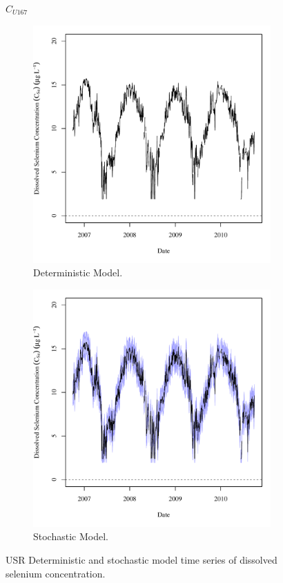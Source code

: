 \subfiguremid
\begin{landscape}
	\begin{figure}
		$ C_{U167} $
		\begin{subfigure}{0.7\textwidth}
			\centering
			\includegraphics[width=\tableCustomSize]{"Figures/Results_USR/Deterministic/c TS RFD"}
			\caption{Deterministic Model.}
		\end{subfigure}%
		\begin{subfigure}{0.7\textwidth}
			\centering
			\includegraphics[width=\tableCustomSize]{"Figures/Results_USR/Stochastic/c TS RFD"}
			\caption{Stochastic Model.}
		\end{subfigure}
		\caption{USR Deterministic and stochastic model time series of dissolved selenium concentration.}
	\end{figure}
\end{landscape}

